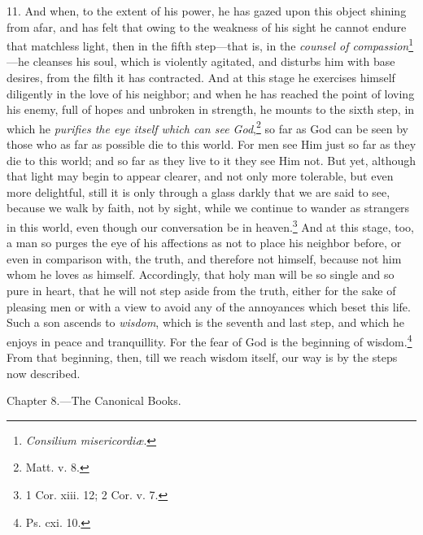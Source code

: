 11. And when, to the extent of his power, he has gazed upon this object shining from afar, and has felt that owing to the weakness of his sight he cannot endure that matchless light, then in the fifth step—that is, in the \emph{ counsel of compassion}\footnote{\emph{Consilium misericordiæ}.}—he cleanses his soul, which is violently agitated, and disturbs him with base desires, from the filth it has contracted. And at this stage he exercises himself diligently in the love of his neighbor; and when he has reached the point of loving his enemy, full of hopes and unbroken in strength, he mounts to the sixth step, in which he \emph{purifies the eye itself which can see God},\footnote{Matt. v. 8.} so far as God can be seen by those who as far as possible die to this world. For men see Him just so far as they die to this world; and so far as they live to it they see Him not. But yet, although that light may begin to appear clearer, and not only more tolerable, but even more delightful, still it is only through a glass darkly that we are said to see, because we walk by faith, not by sight, while we continue to wander as strangers in this world, even though our conversation be in heaven.\footnote{1 Cor. xiii. 12; 2 Cor. v. 7.} And at this stage, too, a man so purges the eye of his affections as not to place his neighbor before, or even in comparison with, the truth, and therefore not himself, because not him whom he loves as himself. Accordingly, that holy man will be so single and so pure in heart, that he will not step aside from the truth, either for the sake of pleasing men or with a view to avoid any of the annoyances which beset this life. Such a son ascends to \emph{ wisdom}, which is the seventh and last step, and which he enjoys in peace and tranquillity. For the fear of God is the beginning of wisdom.\footnote{Ps. cxi. 10.} From that beginning, then, till we reach wisdom itself, our way is by the steps now described.


Chapter 8.—The Canonical Books.

